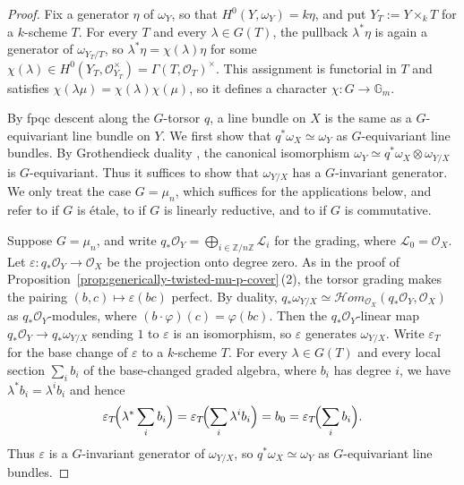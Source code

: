 \documentclass[10pt,abstract=true]{scrartcl}
\numberwithin{equation}{section}
\theoremstyle{definition}
\theoremstyle{remark}
\begin{document}
\begin{proof}
  Fix a generator $\eta$ of $\omega_Y$, so that $H^0(Y,\omega_Y)=k\eta$, and put $Y_T:=Y\times_kT$ for a $k$-scheme $T$.
  For every $T$ and every $\lambda\in G(T)$, the pullback $\lambda^*\eta$ is again a generator of $\omega_{Y_T/T}$, so $\lambda^*\eta=\chi(\lambda)\eta$ for some $\chi(\lambda)\in H^0(Y_T,\mathcal O_{Y_T}^\times)=\Gamma(T,\mathcal O_T)^\times$.
  This assignment is functorial in $T$ and satisfies $\chi(\lambda\mu)=\chi(\lambda)\chi(\mu)$, so it defines a character $\chi\colon G\to\mathbb G_m$.

  By fpqc descent %
  along the $G$-torsor $q$, a line bundle on $X$ is the same as a $G$-equivariant line bundle on $Y$.
  We first show that $q^*\omega_X\simeq\omega_Y$ as $G$-equivariant line bundles.
  By Grothendieck duality \cite[Tag~\href{https://stacks.math.columbia.edu/tag/0C10}{0C10}]{StacksProject}, the canonical isomorphism $\omega_Y\simeq q^*\omega_X\otimes\omega_{Y/X}$ is $G$-equivariant.
  Thus it suffices to show that $\omega_{Y/X}$ has a $G$-invariant generator.
  We only treat the case $G = \mu_n$, which suffices for the applications below, and refer to \cite[Tags~\href{https://stacks.math.columbia.edu/tag/0FWI}{0FWI} and~\href{https://stacks.math.columbia.edu/tag/0ATX}{0ATX}]{StacksProject} if $G$ is \'{e}tale, to \cite[Lemma~4.3.1(ii)]{Brion-equivariantly-normal} if $G$ is linearly reductive, and to \cite[\S\S4.1.4--4.1.5]{Vial-2026} if $G$ is commutative.

  Suppose $G = \mu_n$, and write $q_*\mathcal O_Y = \bigoplus_{i\in\mathbb Z/n\mathbb Z}\mathcal L_i$ for the grading, where $\mathcal L_0 = \mathcal O_X$.
  Let $\varepsilon\colon q_*\mathcal O_Y\to\mathcal O_X$ be the projection onto degree zero.
  As in the proof of Proposition~\ref{prop:generically-twisted-mu-p-cover}\,\textup{(2)}, the torsor grading makes the pairing $(b,c)\mapsto\varepsilon(bc)$ perfect.
  By duality, $q_*\omega_{Y/X}\simeq\mathcal{H}om_{\mathcal O_X}(q_*\mathcal O_Y,\mathcal O_X)$ as $q_*\mathcal O_Y$-modules, where $(b\cdot\varphi)(c) = \varphi(bc)$.
  Then the $q_*\mathcal O_Y$-linear map $q_*\mathcal O_Y\to q_*\omega_{Y/X}$ sending $1$ to $\varepsilon$ is an isomorphism, so $\varepsilon$ generates $\omega_{Y/X}$.
  Write $\varepsilon_T$ for the base change of $\varepsilon$ to a $k$-scheme $T$.
  For every $\lambda\in G(T)$ and every local section $\sum_i b_i$ of the base-changed graded algebra, where $b_i$ has degree $i$, we have $\lambda^*b_i = \lambda^i b_i$ and hence
  \[
    \varepsilon_T\!\Bigl(\lambda^*\sum_i b_i\Bigr)
    = \varepsilon_T\!\Bigl(\sum_i\lambda^i b_i\Big)
    = b_0
    = \varepsilon_T\!\Bigl(\sum_i b_i\Bigr).
  \]
  Thus $\varepsilon$ is a $G$-invariant generator of $\omega_{Y/X}$, so $q^*\omega_X\simeq\omega_Y$ as $G$-equivariant line bundles.


\end{proof}
\end{document}
